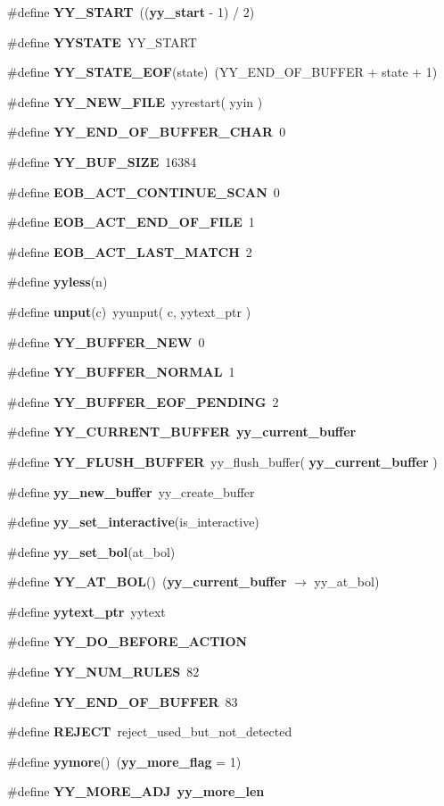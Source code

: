 \begin{CompactItemize}
\#define {\bf YY\_\-START}\ (({\bf yy\_\-start} - 1) / 2)
\item 
\#define {\bf YYSTATE}\ YY\_\-START
\item 
\#define {\bf YY\_\-STATE\_\-EOF}(state)\ (YY\_\-END\_\-OF\_\-BUFFER + state + 1)
\item 
\#define {\bf YY\_\-NEW\_\-FILE}\ yyrestart( yyin )
\item 
\#define {\bf YY\_\-END\_\-OF\_\-BUFFER\_\-CHAR}\ 0
\item 
\#define {\bf YY\_\-BUF\_\-SIZE}\ 16384
\item 
\#define {\bf EOB\_\-ACT\_\-CONTINUE\_\-SCAN}\ 0
\item 
\#define {\bf EOB\_\-ACT\_\-END\_\-OF\_\-FILE}\ 1
\item 
\#define {\bf EOB\_\-ACT\_\-LAST\_\-MATCH}\ 2
\item 
\#define {\bf yyless}(n)
\item 
\#define {\bf unput}(c)\ yyunput( c, yytext\_\-ptr )
\item 
\#define {\bf YY\_\-BUFFER\_\-NEW}\ 0
\item 
\#define {\bf YY\_\-BUFFER\_\-NORMAL}\ 1
\item 
\#define {\bf YY\_\-BUFFER\_\-EOF\_\-PENDING}\ 2
\item 
\#define {\bf YY\_\-CURRENT\_\-BUFFER}\ {\bf yy\_\-current\_\-buffer}
\item 
\#define {\bf YY\_\-FLUSH\_\-BUFFER}\ yy\_\-flush\_\-buffer( {\bf yy\_\-current\_\-buffer} )
\item 
\#define {\bf yy\_\-new\_\-buffer}\ yy\_\-create\_\-buffer
\item 
\#define {\bf yy\_\-set\_\-interactive}(is\_\-interactive)
\item 
\#define {\bf yy\_\-set\_\-bol}(at\_\-bol)
\item 
\#define {\bf YY\_\-AT\_\-BOL}()\ ({\bf yy\_\-current\_\-buffer} $\rightarrow$ yy\_\-at\_\-bol)
\item 
\#define {\bf yytext\_\-ptr}\ yytext
\item 
\#define {\bf YY\_\-DO\_\-BEFORE\_\-ACTION}
\item 
\#define {\bf YY\_\-NUM\_\-RULES}\ 82
\item 
\#define {\bf YY\_\-END\_\-OF\_\-BUFFER}\ 83
\item 
\#define {\bf REJECT}\ reject\_\-used\_\-but\_\-not\_\-detected
\item 
\#define {\bf yymore}()\ ({\bf yy\_\-more\_\-flag} = 1)
\item 
\#define {\bf YY\_\-MORE\_\-ADJ}\ {\bf yy\_\-more\_\-len}

\end{CompactItemize}
